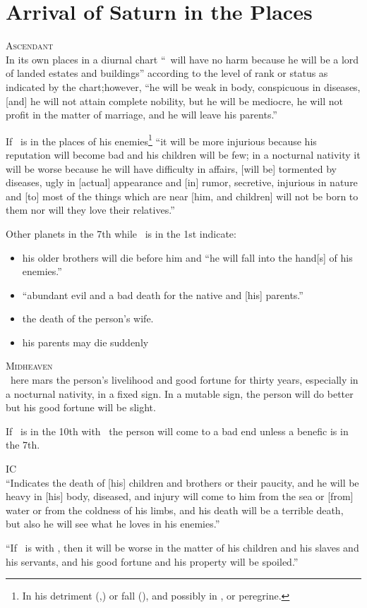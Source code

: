 \section{Arrival of Saturn in the Places}
\textsc{Ascendant} \hfill \\
\indent In its own places in a diurnal chart ``\Saturn\, will have no harm because he will be a lord of landed estates and buildings'' according to the level of rank or status as indicated by the chart;however, ``he will be weak in body, conspicuous in diseases, [and] he will not attain complete nobility, but he will be mediocre, he will not profit in the matter of marriage, and he will leave his parents.''

If \Saturn\, is in the places of his enemies\footnote{In his detriment (\Cancer,\Leo) or fall (\Aries), and possibly in \Scorpio, or peregrine.} ``it will be more injurious because his reputation will become bad and his children will be few; in a nocturnal nativity it will be worse because he will have difficulty in affairs, [will be] tormented by diseases, ugly in [actual] appearance and [in] rumor, secretive, injurious in nature and [to] most of the things which are near [him, and children] will not be born to them nor will they love their relatives.''

Other planets in the 7th while \Saturn\, is in the 1st indicate:
\begin{itemize}[topsep=0em,itemsep=0em]
\item[\Jupiter] his older brothers will die before him and ``he will fall into the hand[s] of his enemies.''

\item[\Mars] ``abundant evil and a bad death for the native and [his] parents.''

\item[\Venus] the death of the person's wife.

\item[\Mercury] his parents may die suddenly
\end{itemize}

\noindent\textsc{Midheaven} \hfill \\
\indent\Saturn\, here mars the person's livelihood and good fortune for thirty years, especially in a nocturnal nativity, in a fixed sign. In a mutable sign, the person will do better but his good fortune will be slight. 

If \Saturn\, is in the 10th with \Mars\, the person will come to a bad end unless a benefic is in the 7th.

\vspace{0.5em}
\noindent\textsc{IC} \hfill \\
\indent ``Indicates the death of [his] children and brothers or their paucity, and he will be heavy in [his] body, diseased, and injury will come to him from the sea or [from] water or from the coldness of his limbs, and his death will be a terrible death, but also he will see what he loves in his enemies.''

``If \Mercury\, is with \Saturn, then it will be worse in the matter of his children and his slaves and his servants, and his good fortune and his property will be spoiled.''
